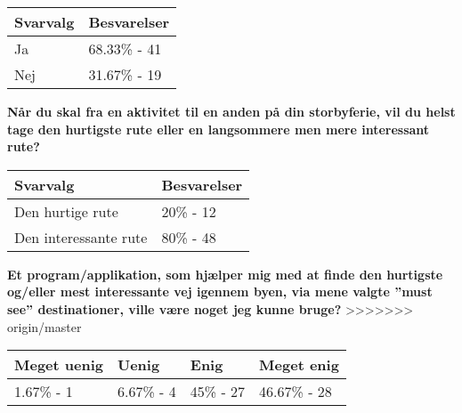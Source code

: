 	\begin{tabular}{| l | l |}
	\hline
	Svarvalg & Besvarelser \\ \hline
	Ja & 68.33\% - 41 \\ \hline
	Nej & 31.67\% - 19 \\
	\hline
	\end{tabular}
\newline
\newline

\textbf{Når du skal fra en aktivitet til en anden på din storbyferie, vil du helst tage den hurtigste rute eller en langsommere men mere interessant rute?}

	\begin{tabular}{| l | l |}
	\hline
	Svarvalg & Besvarelser \\ \hline
	Den hurtige rute & 20\% - 12 \\ \hline
	Den interessante rute & 80\% - 48 \\
	\hline
	\end{tabular}
\newline
\newline

\textbf{Et program/applikation, som hjælper mig med at finde den hurtigste og/eller mest interessante vej igennem byen, via mene valgte ”must see” destinationer, ville være noget jeg kunne bruge?}
>>>>>>> origin/master

\begin{center}
	\begin{tabular}{| l | l | l | l |}
    \hline
    Meget uenig & Uenig & Enig & Meget enig \\ \hline
    1.67\% - 1 & 6.67\% - 4 & 45\% - 27 & 46.67\% - 28 \\
    \hline
    \end{tabular}
\end{center}
